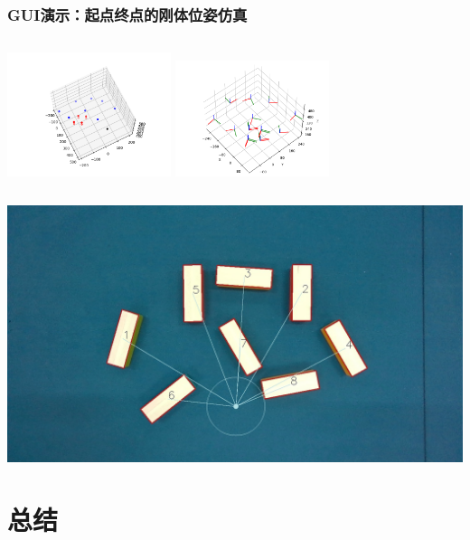 \documentclass{beamer}
\begin{document}
\begin{frame}
    \frametitle{GUI演示：起点终点的刚体位姿仿真}
    \centering
    \begin{columns}
        \column{\dimexpr\linewidth-60mm}
        \includegraphics[width=48mm]{运动规划_3.png}
        \column{45mm}
        \includegraphics[width=45mm]{起点与终点的位姿仿真.png}
    \end{columns}
    \includegraphics[scale=0.10]{img_strategy.jpg}
\end{frame}


\section{总结}
\end{document}
